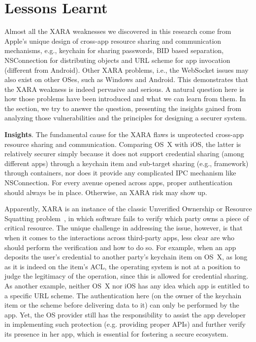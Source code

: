 \documentclass{article}
\newcommand{\ignore}[1]{}
\begin{document}
\vspace {-8pt}
\section{Lessons Learnt}
\label{sec:discuss}


Almost all the XARA weaknesses we discovered in this research come from Apple's unique design of cross-app resource sharing and communication mechanisms, e.g., keychain for sharing passwords, BID based separation, NSConnection for distributing objects and URL scheme for app invocation (different from Android). Other XARA problems, i.e., the WebSocket issues may also exist on other OSes, such as Windows and Android. This demonstrates that the XARA weakness is indeed pervasive and serious\ignore{, across different platforms}.  A natural question here is how those problems have been introduced and what we can learn from them.  In the section, we try to answer the question, presenting the insights gained from analyzing those vulnerabilities and the principles for designing a securer system.


\vspace {3pt}\noindent\textbf{Insights}. The fundamental cause for the XARA flaws is unprotected cross-app resource sharing and communication. Comparing OS~X with iOS, the latter is relatively securer simply because it does not support credential sharing (among different apps) through a keychain item and sub-target sharing (e.g., framework) through containers, nor does it provide any complicated IPC mechanism like NSConnection. For every avenue opened across apps, proper authentication should always be in place. Otherwise, an XARA risk may show up.

Apparently, XARA is an instance of the classic Unverified Ownership or Resource Squatting problem~\cite{cwe283, cwe377, vsj_2012_usenixsec}, in which software fails to verify which party owns a piece of critical resource. The unique challenge in addressing the issue, however, is that when it comes to the interactions across third-party apps, less clear are who should perform the verification and how to do so. For example, when an app deposits the user's credential to another party's keychain item on OS~X, as long as it is indeed on the item's ACL, the operating system is not at a position to judge the legitimacy of the operation, since this is allowed for credential sharing. As another example, neither OS~X nor iOS has any idea which app is entitled to a specific URL scheme. The authentication here (on the owner of the keychain item or the scheme before delivering data to it) can only be performed by the app. Yet, the OS provider still has the responsibility to assist the app developer in implementing such protection (e.g. providing proper APIs) and further verify its presence in her app, which is essential for fostering a secure ecosystem.
\end{document}
